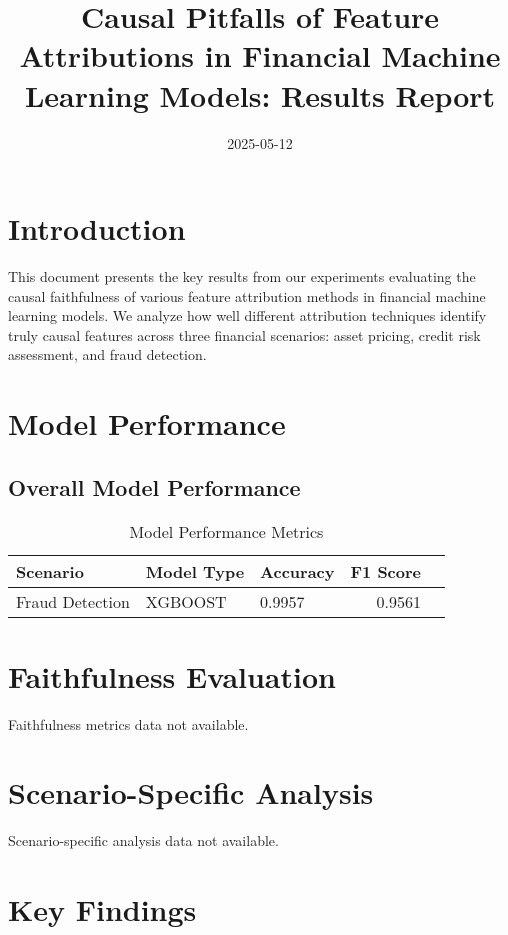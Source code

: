 \documentclass{article}
\title{Causal Pitfalls of Feature Attributions in Financial Machine Learning Models: Results Report}
\date{2025-05-12}
\author{}
\begin{document}
\maketitle

\section{Introduction}

This document presents the key results from our experiments evaluating the causal faithfulness of various feature attribution methods in financial machine learning models. We analyze how well different attribution techniques identify truly causal features across three financial scenarios: asset pricing, credit risk assessment, and fraud detection.

\section{Model Performance}

\subsection{Overall Model Performance}

\begin{table}[H]
\centering
\caption{Model Performance Metrics}
\begin{tabular}{lllrr}
\toprule
Scenario & Model Type & Accuracy & F1 Score \\
\midrule
Fraud Detection & XGBOOST & 0.9957 & 0.9561 \\
\bottomrule
\end{tabular}
\end{table}

\section{Faithfulness Evaluation}

Faithfulness metrics data not available.

\section{Scenario-Specific Analysis}

Scenario-specific analysis data not available.

\section{Key Findings}
\end{document}
